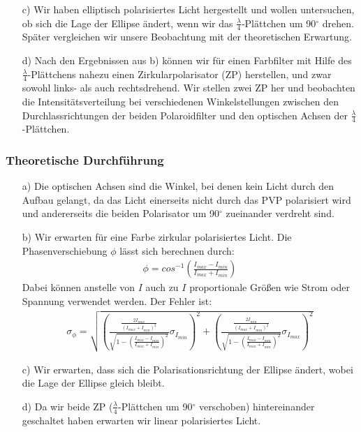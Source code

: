 \documentclass[12pt]{scrartcl}
\begin{document}
\begin{enumerate}
\item[c)] Wir haben elliptisch polarisiertes Licht hergestellt und wollen untersuchen, ob sich die Lage der Ellipse ändert, wenn wir das $\frac{\lambda}{4}$-Plättchen um 90$^\circ$
drehen. Später vergleichen wir unsere Beobachtung mit der theoretischen Erwartung.
\item[d)] Nach den Ergebnissen aus b) können wir für einen Farbfilter mit Hilfe des $\frac{\lambda}{4}$-Plättchens nahezu einen Zirkularpolarisator (ZP) herstellen, und zwar sowohl links- als auch rechtsdrehend. Wir stellen zwei ZP her und beobachten die Intensitätsverteilung bei verschiedenen Winkelstellungen zwischen den Durchlassrichtungen der beiden Polaroidfilter und den optischen Achsen der $\frac{\lambda}{4}$-Plättchen.
\end{enumerate}
\subsubsection{Theoretische Durchführung}
\begin{enumerate}
\item[a)]
Die optischen Achsen sind die Winkel, bei denen kein Licht durch den Aufbau gelangt, da das Licht einerseits nicht durch das PVP polarisiert wird und andererseits die beiden Polarisator um 90$^\circ$ zueinander verdreht sind.
\item[b)]
Wir erwarten für eine Farbe zirkular polarisiertes Licht.
Die Phasenverschiebung $\phi$ lässt sich berechnen durch:
\begin{align}
\phi = cos^{-1}\left(\frac{I_{max}-I_{min}}{I_{max}+I_{min}}\right)
\end{align}
Dabei können anstelle von $I$ auch zu $I$ proportionale Größen wie Strom oder Spannung verwendet werden.
Der Fehler ist:
\begin{align}
\sigma_{\phi} = \sqrt{
\left(\frac{\frac{2I_{max}}{(I_{max}+I_{min})^2}}{\sqrt{1-\left(\frac{I_{max}-I_{min}}{I_{max}+
I_{min}}\right)^2}}\sigma_{I_{min}}\right)^2+
\left(\frac{\frac{2I_{min}}{(I_{max}+I_{min})^2}}{\sqrt{1-\left(\frac{I_{max}-I_{min}}{I_{max}+
I_{min}}\right)^2}}\sigma_{I_{max}}\right)^2}
\end{align}
\item[c)]
Wir erwarten, dass sich die Polarisationsrichtung der Ellipse ändert, wobei die Lage der Ellipse gleich bleibt.
\item[d)]
Da wir beide ZP ($\frac{\lambda}{4}$-Plättchen um 90$^\circ$ verschoben) hintereinander geschaltet haben erwarten wir linear polarisiertes Licht.
\end{enumerate}
\end{document}
